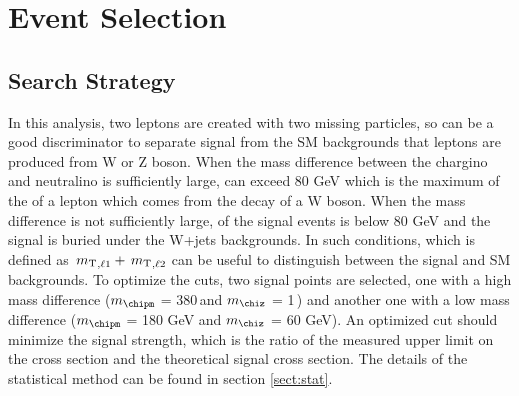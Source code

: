 \section{Event Selection}
\subsection{Search Strategy}
\label{sect:cuts}
In this analysis, two leptons are created with two missing particles, so \mttwo can be a good discriminator to separate signal 
from the SM backgrounds that leptons are produced from W or Z boson. When the mass difference between the chargino and neutralino 
is sufficiently large, \mttwo can exceed 80 GeV which is the maximum of the \mt of a lepton which comes from the decay of a W boson.
When the mass difference is not sufficiently large, \mttwo of the signal events is below 80 GeV and the signal is buried under the W+jets
backgrounds. In such conditions, \SumMT which is defined as $\,{m_{\rm T}}_{,\ell1} + \,{m_{\rm T}}_{,\ell2}$ can be useful to distinguish between the signal and 
SM backgrounds.
To optimize the cuts, two signal points are selected, one with a high mass difference ($m_{\chipm}$ = 380\,\GeV and $m_{\chiz}$ = 1\,\GeV) and
another one with a low mass difference ($m_{\chipm}$ = 180 GeV and $m_{\chiz}$ = 60 GeV). An optimized cut should minimize the signal strength, 
which is the ratio of the measured upper limit on the cross section and the theoretical signal cross section. The details of the statistical 
method can be found in section \ref{sect:stat}.

